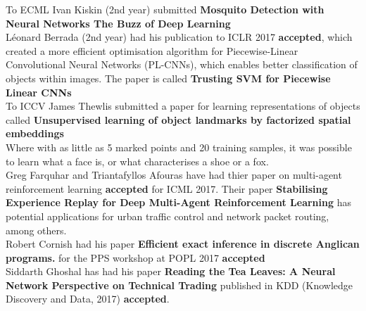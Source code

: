\documentclass[10pt,final]{papertex}
\begin{document}
\begin{news}{1}
 To ECML Ivan Kiskin (2nd year) submitted \textbf{Mosquito Detection with Neural Networks The Buzz of Deep Learning}\\
 
 
L\'eonard Berrada (2nd year) had his publication to ICLR 2017 \textbf{accepted}, which created a more efficient optimisation algorithm for  Piecewise-Linear Convolutional Neural Networks (PL-CNNs), which enables better classification of objects within images. The paper is called \textbf{Trusting SVM for Piecewise Linear CNNs}\\

To ICCV James Thewlis submitted a paper for learning representations of objects called \textbf{Unsupervised learning of object landmarks by factorized spatial embeddings}\\
Where with as little as 5 marked points and 20 training samples, it was possible to learn what a face is, or what characterises a shoe or a fox.\\

Greg Farquhar and Triantafyllos Afouras have had thier paper on multi-agent reinforcement learning \textbf{accepted} for ICML 2017. Their paper \textbf{Stabilising Experience Replay for Deep Multi-Agent Reinforcement Learning} has potential applications for urban traffic control and network packet routing, among others. \\

Robert Cornish had his paper \textbf{Efficient exact inference in discrete Anglican programs.} for the PPS workshop at POPL 2017 \textbf{accepted}  \\

Siddarth Ghoshal has had his paper \textbf{Reading the Tea Leaves: A Neural Network Perspective on Technical Trading} published in KDD (Knowledge Discovery and Data, 2017) \textbf{accepted}.
\end{news}

\newssep

\end{document}

